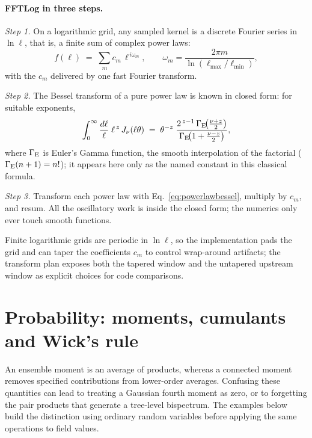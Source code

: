 \documentclass[11pt]{article}
\numberwithin{equation}{section}
\begin{document}
\paragraph{FFTLog in three steps.}
\emph{Step 1.}  On a logarithmic grid, any sampled kernel is a
discrete Fourier series in $\ln\ell$, that is, a finite sum of
complex power laws:
\begin{equation}
  f(\ell) \;=\; \sum_{m} c_m\,
  \ell^{\,i\omega_m} ,
  \qquad
  \omega_m = \frac{2\pi m}{\ln(\ell_{\max}/\ell_{\min})} ,
  \label{eq:fftlogdecomp}
\end{equation}
with the $c_m$ delivered by one fast Fourier transform.

\emph{Step 2.}  The Bessel transform of a pure power law is known
in closed form: for suitable exponents,
\begin{equation}
  \int_0^\infty \frac{d\ell}{\ell}\; \ell^{\,z}\,
  J_\nu(\ell\theta)
  \;=\; \theta^{-z}\;
  \frac{2^{\,z-1}\,
  \Gamma_{\rm E}\!\bigl(\tfrac{\nu + z}{2}\bigr)}
  {\Gamma_{\rm E}\!\bigl(1 + \tfrac{\nu - z}{2}\bigr)} ,
  \label{eq:powerlawbessel}
\end{equation}
where $\Gamma_{\rm E}$ is Euler's Gamma function, the smooth
interpolation of the factorial ($\Gamma_{\rm E}(n+1) = n!$); it
appears here only as the named constant in this classical formula.

\emph{Step 3.}  Transform each power law with
Eq.~\eqref{eq:powerlawbessel}, multiply by $c_m$, and resum.  All
the oscillatory work is inside the closed form; the numerics only
ever touch smooth functions.

Finite logarithmic grids are periodic in $\ln\ell$, so the
implementation pads the grid and can taper the coefficients
$c_m$ to control wrap-around artifacts; the transform plan exposes
both the tapered window and the untapered upstream window as
explicit choices for code comparisons.

\section{Probability: moments, cumulants and Wick's rule}
\label{app:probability}

An ensemble moment is an average of products, whereas a connected moment
removes specified contributions from lower-order averages. Confusing
these quantities can lead to treating a Gaussian fourth moment as zero,
or to forgetting the pair products that generate a tree-level bispectrum.
The examples below build the distinction using ordinary random variables
before applying the same operations to field values.
\end{document}
